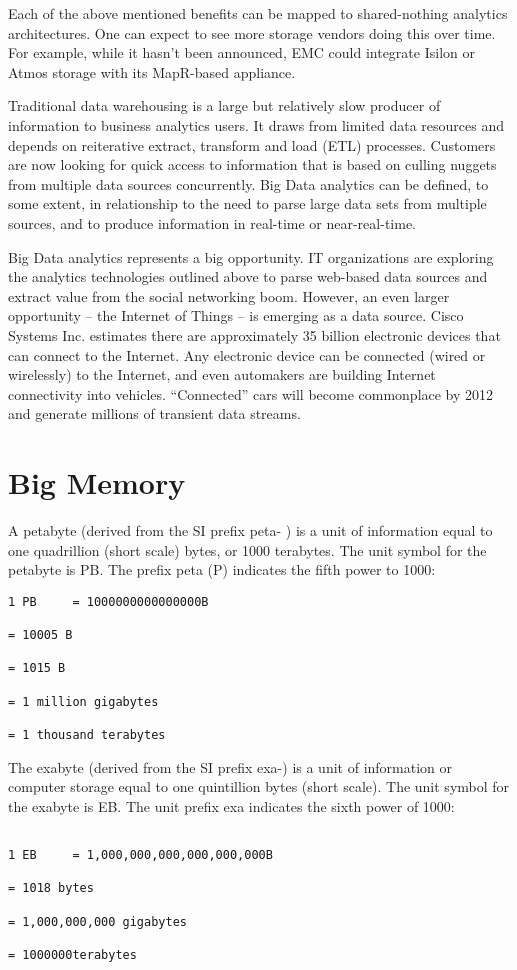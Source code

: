 \documentclass[12pt]{article}
\begin{document}
Each of the above mentioned benefits can be mapped to shared-nothing analytics architectures. One can expect to see more storage vendors doing this over time. For example, while it hasn’t been announced, EMC could integrate Isilon or Atmos storage with its MapR-based appliance.


Traditional data warehousing is a large but relatively slow producer of information to business analytics users. It draws from limited data resources and depends on reiterative extract, transform and load (ETL) processes. Customers are now looking for quick access to information that is based on culling nuggets from multiple data sources concurrently. Big Data analytics can be defined, to some extent, in relationship to the need to parse large data sets from multiple sources, and to produce information in real-time or near-real-time.


Big Data analytics represents a big opportunity. IT organizations are exploring the analytics technologies outlined above to parse web-based data sources and extract value from the social networking boom. However, an even larger opportunity -- the Internet of Things -- is emerging as a data source. Cisco Systems Inc. estimates there are approximately 35 billion electronic devices that can connect to the Internet. Any electronic device can be connected (wired or wirelessly) to the Internet, and even automakers are building Internet connectivity into vehicles. “Connected” cars will become commonplace by 2012 and generate millions of transient data streams.

\section{Big Memory}

A petabyte (derived from the SI prefix peta- ) is a unit of information equal to one quadrillion (short scale) bytes, or 1000 terabytes. The unit symbol for the petabyte is PB. The prefix peta (P) indicates the fifth power to 1000:

\begin{verbatim}
1 PB     = 1000000000000000B

= 10005 B

= 1015 B

= 1 million gigabytes

= 1 thousand terabytes
\end{verbatim}

The exabyte (derived from the SI prefix exa-) is a unit of information or computer storage equal to one quintillion bytes (short scale). The unit symbol for the exabyte is EB. The unit prefix exa indicates the sixth power of 1000:
\begin{verbatim}

1 EB     = 1,000,000,000,000,000,000B

= 1018 bytes

= 1,000,000,000 gigabytes

= 1000000terabytes
\end{verbatim}
\end{document}
